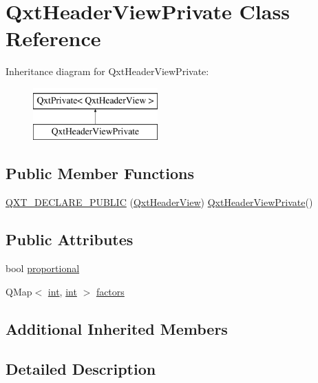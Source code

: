 \hypertarget{class_qxt_header_view_private}{\section{Qxt\-Header\-View\-Private Class Reference}
\label{class_qxt_header_view_private}
}
Inheritance diagram for Qxt\-Header\-View\-Private\-:\begin{figure}[H]
\begin{center}
\leavevmode
\includegraphics[height=2.000000cm]{class_qxt_header_view_private}
\end{center}
\end{figure}
\subsection*{Public Member Functions}
\begin{DoxyCompactItemize}
\item 
\hyperlink{class_qxt_header_view_private_abbe11f3b05dc6e038d6d11debfa4f20e}{Q\-X\-T\-\_\-\-D\-E\-C\-L\-A\-R\-E\-\_\-\-P\-U\-B\-L\-I\-C} (\hyperlink{class_qxt_header_view}{Qxt\-Header\-View}) \hyperlink{class_qxt_header_view_private}{Qxt\-Header\-View\-Private}()
\end{DoxyCompactItemize}
\subsection*{Public Attributes}
\begin{DoxyCompactItemize}
\item 
bool \hyperlink{class_qxt_header_view_private_a358d5b4e206c14cf0f59bc2709af7773}{proportional}
\item 
Q\-Map$<$ \hyperlink{ioapi_8h_a787fa3cf048117ba7123753c1e74fcd6}{int}, \hyperlink{ioapi_8h_a787fa3cf048117ba7123753c1e74fcd6}{int} $>$ \hyperlink{class_qxt_header_view_private_a6b1df0ad651a1d4fd8e3ca8b12275d75}{factors}
\end{DoxyCompactItemize}
\subsection*{Additional Inherited Members}


\subsection{Detailed Description}


